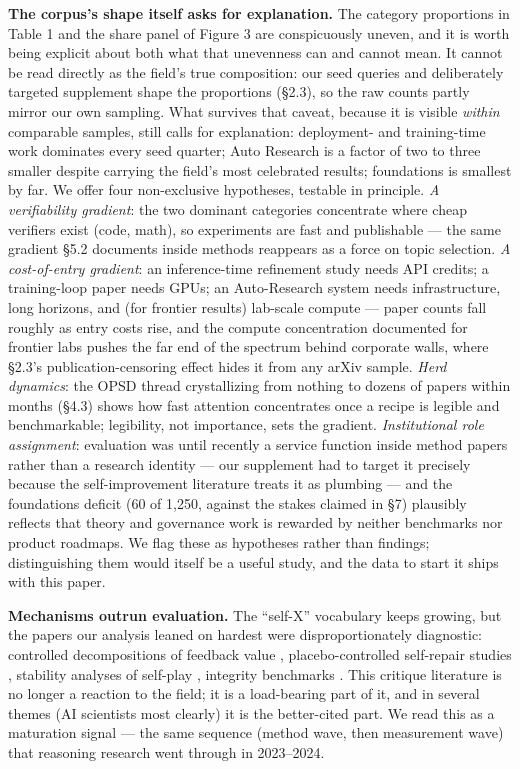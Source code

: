\documentclass[
  11pt,
]{article}
\begin{document}
\textbf{The corpus's shape itself asks for explanation.} The category
proportions in Table 1 and the share panel of Figure 3 are conspicuously
uneven, and it is worth being explicit about both what that unevenness
can and cannot mean. It cannot be read directly as the field's true
composition: our seed queries and deliberately targeted supplement shape
the proportions (§2.3), so the raw counts partly mirror our own
sampling. What survives that caveat, because it is visible \emph{within}
comparable samples, still calls for explanation: deployment- and
training-time work dominates every seed quarter; Auto Research is a
factor of two to three smaller despite carrying the field's most
celebrated results; foundations is smallest by far. We offer four
non-exclusive hypotheses, testable in principle. \emph{A verifiability
gradient}: the two dominant categories concentrate where cheap verifiers
exist (code, math), so experiments are fast and publishable --- the same
gradient §5.2 documents inside methods reappears as a force on topic
selection. \emph{A cost-of-entry gradient}: an inference-time refinement
study needs API credits; a training-loop paper needs GPUs; an
Auto-Research system needs infrastructure, long horizons, and (for
frontier results) lab-scale compute --- paper counts fall roughly as
entry costs rise, and the compute concentration documented for frontier
labs \citep{whitfill2025will} pushes the far end of the spectrum behind
corporate walls, where §2.3's publication-censoring effect hides it from
any arXiv sample. \emph{Herd dynamics}: the OPSD thread crystallizing
from nothing to dozens of papers within months (§4.3) shows how fast
attention concentrates once a recipe is legible and benchmarkable;
legibility, not importance, sets the gradient. \emph{Institutional role
assignment}: evaluation was until recently a service function inside
method papers rather than a research identity --- our supplement had to
target it precisely because the self-improvement literature treats it as
plumbing --- and the foundations deficit (60 of 1,250, against the
stakes claimed in §7) plausibly reflects that theory and governance work
is rewarded by neither benchmarks nor product roadmaps. We flag these as
hypotheses rather than findings; distinguishing them would itself be a
useful study, and the data to start it ships with this paper.

\textbf{Mechanisms outrun evaluation.} The ``self-X'' vocabulary keeps
growing, but the papers our analysis leaned on hardest were
disproportionately diagnostic: controlled decompositions of feedback
value \citep{cupia2026drives}, placebo-controlled self-repair studies
\citep{iscan2026falsification}, stability analyses of self-play
\citep{pu2026survive}, integrity benchmarks
\citep{yang2026sciintegrity}. This critique literature is no longer a
reaction to the field; it is a load-bearing part of it, and in several
themes (AI scientists most clearly) it is the better-cited part. We read
this as a maturation signal --- the same sequence (method wave, then
measurement wave) that reasoning research went through in 2023--2024.
\end{document}
